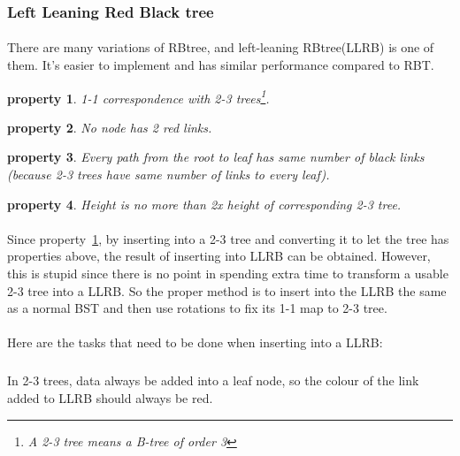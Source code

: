 \documentclass{article}
\newtheorem{property}{property}[section]
\begin{document}
\subsubsection{Left Leaning Red Black tree}

\paragraph{}
There are many variations of RBtree, and left-leaning RBtree(LLRB) is one of them. It's easier to implement and has similar performance compared to RBT.

\begin{property}\label{BRT1on1}
    1-1 correspondence with 2-3 trees\footnote{A 2-3 tree means a B-tree of order 3}.
\end{property}

\begin{property}
    No node has 2 red links.
\end{property}

\begin{property}
    Every path from the root to leaf has same number of black links (because 2-3 trees have same number of links to every leaf).
\end{property}

\begin{property}
    Height is no more than 2x height of corresponding 2-3 tree.
\end{property}

\paragraph{}
Since property~\ref{BRT1on1}, by inserting into a 2-3 tree and converting it to let the tree has properties above, the result of inserting into LLRB can be obtained. However, this is stupid since there is no point in spending extra time to transform a usable 2-3 tree into a LLRB. So the proper method is to insert into the LLRB the same as a normal BST and then use rotations to fix its 1-1 map to 2-3 tree.

\paragraph{}
Here are the tasks that need to be done when inserting into a LLRB:

\subparagraph{}\label{LLRB_insert}
In 2-3 trees, data always be added into a leaf node, so the colour of the link added to LLRB should always be red.
\end{document}
